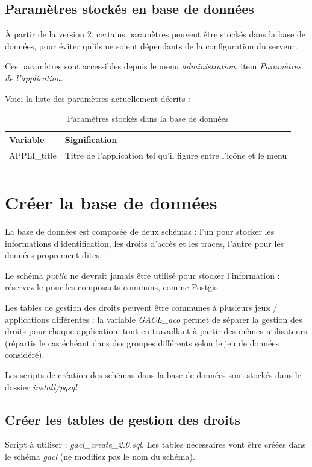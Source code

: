 \subsection{Paramètres stockés en base de données}
\label{paramdb}

À partir de la version 2, certains paramètres peuvent être stockés dans la base de données, pour éviter qu'ils ne soient dépendants de la configuration du serveur.

Ces paramètres sont accessibles depuis le menu \textit{administration}, item \textit{Paramètres de l'application}.

Voici la liste des paramètres actuellement décrits :
\begin{longtable}{|p{4cm}|p{11cm}|}
\hline
\textbf{Variable} & \textbf{Signification} \\
\hline
\endhead
APPLI\_title & Titre de l'application tel qu'il figure entre l'icône et le menu\\
\hline
\caption{Paramètres stockés dans la base de données}
\end{longtable}


\section{Créer la base de données}

La base de données est composée de deux schémas : l'un pour stocker les informations d'identification, les droits d'accès et les traces, l'autre pour les données proprement dites.

Le schéma \textit{public} ne devrait jamais être utilisé pour stocker l'information : réservez-le pour les composants communs, comme Postgis.

Les tables de gestion des droits peuvent être communes à plusieurs jeux / applications différentes : la variable \textit{GACL\_aco} permet de séparer la gestion des droits pour chaque application, tout en travaillant à partir des mêmes utilisateurs (répartis le cas échéant dans des groupes différents selon le jeu de données considéré).

Les scripts de création des schémas dans la base de données sont stockés dans le dossier \textit{install/pgsql}. 



\subsection{Créer les tables de gestion des droits}
Script à utiliser : \textit{gacl\_create\_2.0.sql}. Les tables nécessaires vont être créées dans le schéma \textit{gacl} (ne modifiez pas le nom du schéma).

